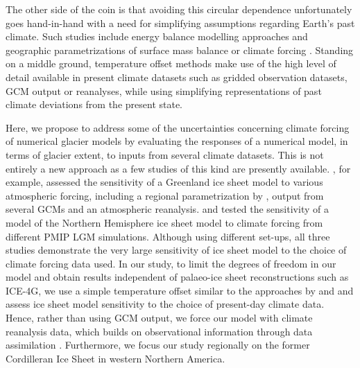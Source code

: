 The other side of the coin is that avoiding this circular dependence unfortunately goes hand-in-hand with a need for simplifying assumptions regarding Earth's past climate. Such studies include energy balance modelling approaches \citep{tarasov-peltier-1997} and geographic parametrizations of surface mass balance \citep{robert-1991} or climate forcing \citep{johnson-fastook-2002}. Standing on a middle ground, temperature offset methods \citep{greve-etal-1999,bintanja-etal-2005} make use of the high level of detail available in present climate datasets such as gridded observation datasets, GCM output or reanalyses, while using simplifying representations of past climate deviations from the present state.

Here, we propose to address some of the uncertainties concerning climate forcing of numerical glacier models by evaluating the responses of a numerical model, in terms of glacier extent, to inputs from several climate datasets. This is not entirely a new approach as a few studies of this kind are presently available. \citet{quiquet-etal-2012}, for example, assessed the sensitivity of a Greenland ice sheet model to various atmospheric forcing, including a regional parametrization by \citet{fausto-etal-2009}, output from several GCMs and an atmospheric reanalysis. \citet{rodgers-etal-2004} and \citet{charbit-etal-2007} tested the sensitivity of a model of the Northern Hemisphere ice sheet model to climate forcing from different PMIP LGM simulations. Although using different set-ups, all three studies demonstrate the very large sensitivity of ice sheet model to the choice of climate forcing data used. In our study, to limit the degrees of freedom in our model and obtain results independent of palaeo-ice sheet reconstructions such as ICE-4G, we use a simple temperature offset similar to the approaches by \citet{greve-etal-1999} and \citet{bintanja-etal-2005} and assess ice sheet model sensitivity to the choice of present-day climate data. Hence, rather than using GCM output, we force our model with climate reanalysis data, which builds on observational information through data assimilation \citep{bengtsson-etal-2007}. Furthermore, we focus our study regionally on the former Cordilleran Ice Sheet in western Northern America.

